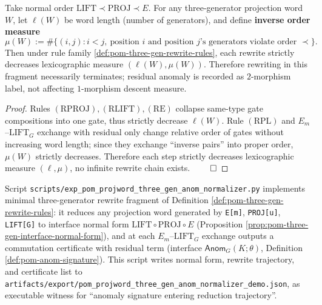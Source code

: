\begin{proposition}\label{prop:pom-three-gen-termination}
Take normal order
\(
\mathrm{LIFT}\prec \mathrm{PROJ}\prec E
\).
For any three-generator projection word \(W\), let \(\ell(W)\) be word length (number of generators), and define \textbf{inverse order measure}
\[
\mu(W):=\#\{(i,j):i<j,\ \text{position }i\text{ and position }j\text{'s generators violate order }\prec\}.
\]
Then under rule family \ref{def:pom-three-gen-rewrite-rules}, each rewrite strictly decreases lexicographic measure
\(
(\ell(W),\mu(W))
\).
Therefore rewriting in this fragment necessarily terminates; residual anomaly is recorded as \(2\)-morphism label, not affecting \(1\)-morphism descent measure.
\end{proposition}
\begin{proof}
Rules \((\mathrm{RPROJ}),(\mathrm{RLIFT}),(\mathrm{RE})\) collapse same-type gate compositions into one gate, thus strictly decrease \(\ell(W)\).
Rule \((\mathrm{RPL})\) and \(E_m\)--\(\mathrm{LIFT}_G\) exchange with residual only change relative order of gates without increasing word length; since they exchange ``inverse pairs'' into proper order, \(\mu(W)\) strictly decreases.
Therefore each step strictly decreases lexicographic measure \((\ell,\mu)\), no infinite rewrite chain exists. $\qed$
\end{proof}

\begin{remark}\label{rem:pom-projword-threegen-anom-normalizer-demo}
Script \texttt{scripts/exp\_pom\_projword\_three\_gen\_anom\_normalizer.py} implements minimal three-generator rewrite fragment of Definition \ref{def:pom-three-gen-rewrite-rules}:
it reduces any projection word generated by \texttt{E[m]}, \texttt{PROJ[u]}, \texttt{LIFT[G]} to interface normal form
\(\mathrm{LIFT}\circ\mathrm{PROJ}\circ E\) (Proposition \ref{prop:pom-three-gen-interface-normal-form}),
and at each \(E_m\)--\(\mathrm{LIFT}_G\) exchange outputs a commutation certificate with residual term
(interface \(\mathsf{Anom}_G(K;\theta)\), Definition \ref{def:pom-anom-signature}).
This script writes normal form, rewrite trajectory, and certificate list to
\texttt{artifacts/export/pom\_projword\_three\_gen\_anom\_normalizer\_demo.json},
as executable witness for ``anomaly signature entering reduction trajectory''.
\end{remark}

